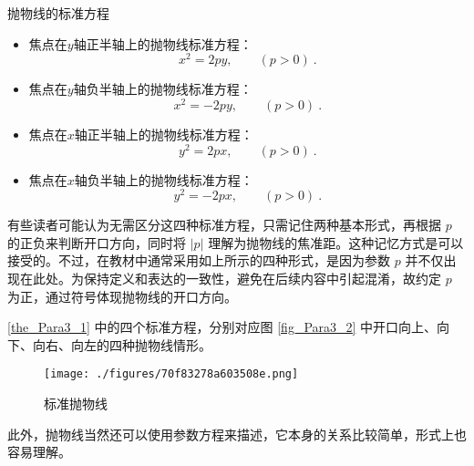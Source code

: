 \begin{theorem}{抛物线的标准方程}\label{the_Para3_1}
\begin{itemize}
\item 焦点在$y$轴正半轴上的抛物线标准方程：
\begin{equation}
x^2=2py,\qquad(p>0)~.
\end{equation}
\item 焦点在$y$轴负半轴上的抛物线标准方程：
\begin{equation}
x^2=-2py,\qquad(p>0)~.
\end{equation}
\item 焦点在$x$轴正半轴上的抛物线标准方程：
\begin{equation}\label{eq_Para3_3}
y^2=2px,\qquad(p>0)~.
\end{equation}
\item 焦点在$x$轴负半轴上的抛物线标准方程：
\begin{equation}
y^2=-2px,\qquad(p>0)~.
\end{equation}
\end{itemize}
\end{theorem}

有些读者可能认为无需区分这四种标准方程，只需记住两种基本形式，再根据 $p$ 的正负来判断开口方向，同时将 $|p|$ 理解为抛物线的焦准距。这种记忆方式是可以接受的。不过，在教材中通常采用如上所示的四种形式，是因为参数 $p$ 并不仅出现在此处。为保持定义和表达的一致性，避免在后续内容中引起混淆，故约定 $p$ 为正，通过符号体现抛物线的开口方向。

\autoref{the_Para3_1} 中的四个标准方程，分别对应图 \autoref{fig_Para3_2} 中开口向上、向下、向右、向左的四种抛物线情形。

\begin{figure}[ht]
\centering
\texttt{[image: ./figures/70f83278a603508e.png]}
\caption{标准抛物线} \label{fig_Para3_2}
\end{figure}

此外，抛物线当然还可以使用参数方程来描述，它本身的关系比较简单，形式上也容易理解。

